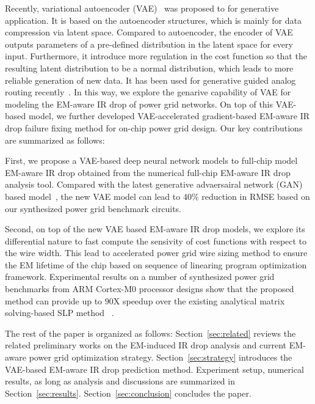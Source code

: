 Recently, variational autoencoder (VAE)~\cite{Diederik:arxiv'22} was proposed to for generative application. It is based on the autoencoder structures, which is mainly for data compression via latent space. Compared to autoencoder, the encoder of VAE outputs parameters of a pre-defined distribution in the latent space for every input. Furthermore, it introduce more regulation in the cost function so that the resulting latent distribution to be a normal distribution, which leads to more reliable generation of new data. It has been used for generative guided analog routing recently~\cite{Zhu:ICCAD'19}.
In this way, we explore the genarive capability of VAE for modeling the EM-aware IR drop of power grid networks. On top of this VAE-based model, we further developed VAE-accelerated gradient-based EM-aware IR drop failure fixing method for on-chip power grid design. Our key contributions are summarized as follows:

\begin{itemlist}
\item First, we propose a VAE-based deep neural network models to full-chip model EM-aware IR drop obtained from the numerical full-chip EM-aware IR drop analysis tool.  Compared with the latest generative advaersairal network (GAN) based model~\cite{ZhouJin:ICCAD'20}, the new VAE model can lead to 40$\%$ reduction in RMSE based on our synthesized power grid benchmark circuits.

\item Second, on top of the new VAE based EM-aware IR drop models, we explore its differential nature to fast compute the sensivity of cost functions with respect to the wire width. This lead to accelerated power grid wire sizing method to ensure the EM lifetime of the chip based on sequence of linearing program optimization framework. Experimental results on a number of synthesized power grid benchmarks from ARM Cortex-M0 processor designs show that the proposed method can provide up to $90$X speedup over the existing analytical matrix solving-based SLP method ~\cite{Sukharev:2019pg}.
 
\end{itemlist}

The rest of the paper is organized as follows: Section~\ref{sec:related} reviews the related preliminary works on the EM-induced IR drop analysis and current EM-aware power grid optimization strategy. Section~\ref{sec:strategy} introduces the VAE-based EM-aware IR drop prediction method. Experiment setup, numerical results, as long as analysis and discussions are summarized in Section~\ref{sec:results}.  Section~\ref{sec:conclusion} concludes the paper.